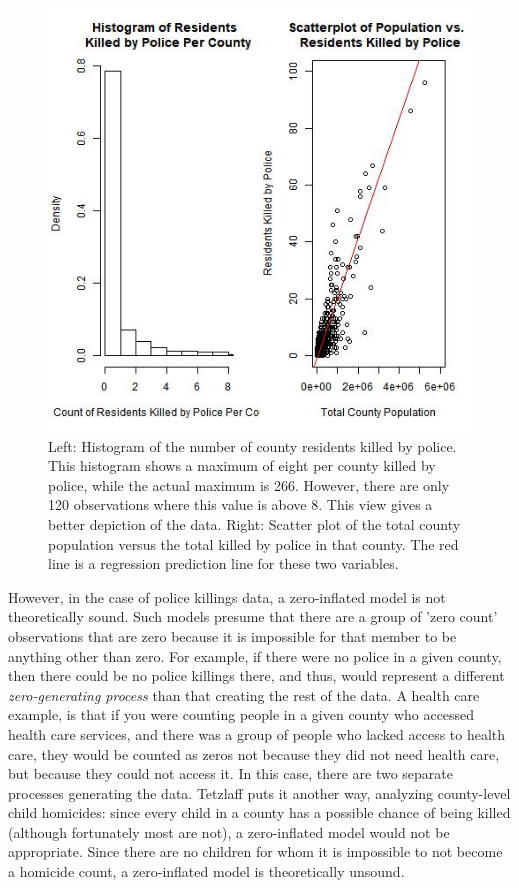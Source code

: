 \documentclass[sigconf]{acmart}
\begin{document}
\begin{figure}
\includegraphics[width=1.0\textwidth]{images/figure2.jpg}
\caption{Left: Histogram of the number of county residents killed by police.  This histogram shows a maximum of eight per county killed by police, while the actual maximum is 266.  However, there are only 120 observations where this value is above 8.  This view gives a better depiction of the data.  Right: Scatter plot of the total county population versus the total killed by police in that county.  The red line is a regression prediction line for these two variables.}
\end{figure}

However, in the case of police killings data, a zero-inflated model is not theoretically sound.  Such models presume that there are a group of 'zero count' observations that are zero because it is impossible for that member to be anything other than zero.  For example, if there were no police in a given county, then there could be no police killings there, and thus, would represent a different {\em zero-generating process} than that creating the rest of the data. \cite{min02,feng16,neelon16} A health care example, is that if you were counting people in a given county who accessed health care services, and there was a group of people who lacked access to health care, they would be counted as zeros not because they did not need health care, but because they could not access it. In this case, there are two separate processes generating the data. \cite{neelon16} Tetzlaff puts it another way, analyzing county-level child homicides: since every child in a county has a possible chance of being killed (although fortunately most are not), a zero-inflated model would not be appropriate. Since there are no children for whom it is impossible to not become a homicide count, a zero-inflated model is theoretically unsound.  \cite{tetzlaff13}
\end{document}
